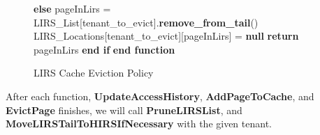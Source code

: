 \begin{figure}[htbp]
\begin{minipage}{\linewidth}
\begin{algorithm}[H]
\begin{algorithmic}
            \STATE \hspace{\algorithmicindent} \textbf{else}
            \STATE \hspace{\algorithmicindent} \hspace{\algorithmicindent} pageInLirs = LIRS\_List[tenant\_to\_evict].\textbf{remove\_from\_tail}()
            \STATE \hspace{\algorithmicindent} \hspace{\algorithmicindent} LIRS\_Locations[tenant\_to\_evict][pageInLirs] = \textbf{null}
            \STATE \hspace{\algorithmicindent} \hspace{\algorithmicindent} \textbf{return} pageInLirs
            \STATE \hspace{\algorithmicindent} \textbf{end if}
            \STATE \textbf{end function}
        \end{algorithmic}
    \end{algorithm}
    \caption{LIRS Cache Eviction Policy}
    \label{fig:lirs}
    \end{minipage}
\end{figure}

\newpage

After each function, \textbf{UpdateAccessHistory}, \textbf{AddPageToCache}, and \textbf{EvictPage} 
finishes, we will call \textbf{PruneLIRSList}, and \textbf{MoveLIRSTailToHIRSIfNecessary} with the 
given tenant.

